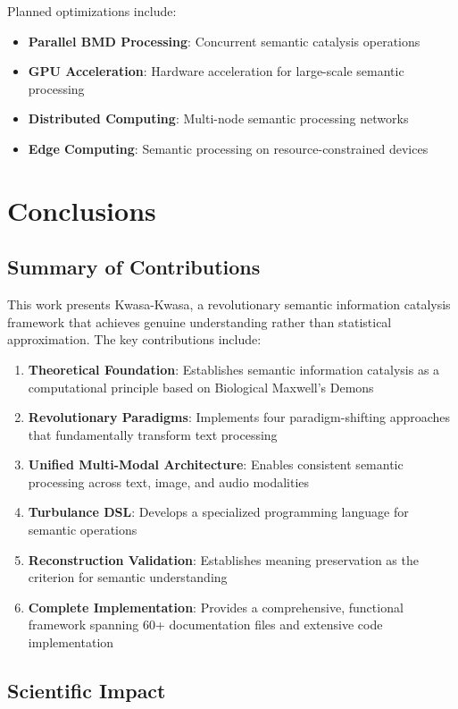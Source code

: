 \documentclass[12pt,a4paper,twoside]{article}
\begin{document}
\begin{itemize}
Planned optimizations include:

\begin{itemize}
\item \textbf{Parallel BMD Processing}: Concurrent semantic catalysis operations
\item \textbf{GPU Acceleration}: Hardware acceleration for large-scale semantic processing
\item \textbf{Distributed Computing}: Multi-node semantic processing networks
\item \textbf{Edge Computing}: Semantic processing on resource-constrained devices
\end{itemize}

\section{Conclusions}

\subsection{Summary of Contributions}

This work presents Kwasa-Kwasa, a revolutionary semantic information catalysis framework that achieves genuine understanding rather than statistical approximation. The key contributions include:

\begin{enumerate}
\item \textbf{Theoretical Foundation}: Establishes semantic information catalysis as a computational principle based on Biological Maxwell's Demons
\item \textbf{Revolutionary Paradigms}: Implements four paradigm-shifting approaches that fundamentally transform text processing
\item \textbf{Unified Multi-Modal Architecture}: Enables consistent semantic processing across text, image, and audio modalities
\item \textbf{Turbulance DSL}: Develops a specialized programming language for semantic operations
\item \textbf{Reconstruction Validation}: Establishes meaning preservation as the criterion for semantic understanding
\item \textbf{Complete Implementation}: Provides a comprehensive, functional framework spanning 60+ documentation files and extensive code implementation
\end{enumerate}

\subsection{Scientific Impact}


\end{itemize}
\end{document}
